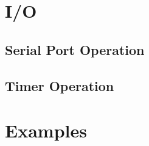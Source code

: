 \documentclass[journal]{IEEEtran}
\begin{document}
{\section{I/O}
\subsection{Serial Port Operation}
\subsection{Timer Operation}

\pagebreak
\section{Examples}
} %
\end{document}
